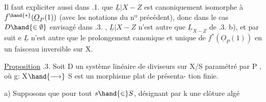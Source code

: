 Il faut expliciter aussi dans .1. que $\underline{L}|X-Z$ est canoniquement
isomorphe à $f^{\hand{*}}(\underline{O}_P(1))$ (avec les notations du nº précédent), donc dans
le cas $D \hand{\in\emptyset}$ envisagé dans .3. , $\underline{L}|X-Z$ n'est autre que $\underline{L}_{X-Z}$
de .3. b), et par suit e $\underline{L}$ n'est autre que le prolongement canonique et
unique de $f^*(\underline{O}_P(1))$ en un faisceau inversible sur X.

\uline{Proposition} .3. Soit D un système linéaire de diviseurs sur X/S
paramétré par \hand{$\check{\ }$}P , où g: X$\hand{\longrightarrow}$ S est  un morphisme plat  de présenta-%
tion finie.

a) Supposons  que pour tout $s \hand{\in} S$, désignant par k une clôture algé

